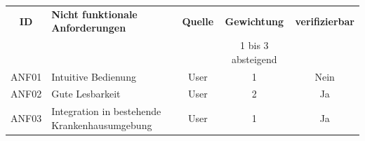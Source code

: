 \documentclass[a4paper, ngerman, 12pt]{scrartcl}
\begin{document}
 \begin{adjustbox}{max width=\textwidth}
\begin{tabular}{|c|l|c|c|c|}
\hline
\rowcolor{lightgray}\textbf{ID}	&\textbf{Nicht funktionale Anforderungen}	&\textbf{Quelle}&\textbf{Gewichtung}	&\textbf{verifizierbar}\\
\rowcolor{lightgray}	&						&		&\scriptsize{1 bis 3 absteigend}			&\\
\hline
ANF01&Intuitive Bedienung						&User		&1		&Nein\\
\hline
ANF02&Gute Lesbarkeit						&User		&2		&Ja\\
\hline
ANF03&Integration in bestehende Krankenhausumgebung
						&User		&1		&Ja\\
						\hline
\end{tabular}
\end{adjustbox}
\end{document}
